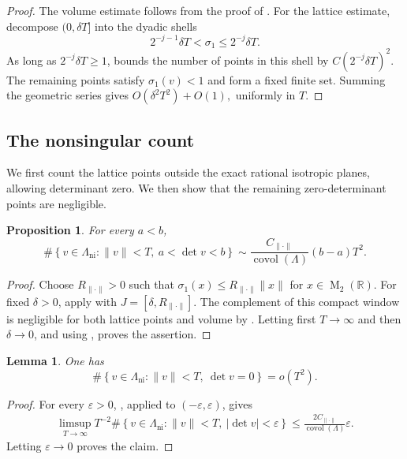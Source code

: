 \documentclass[reqno,11pt]{amsart}
\newtheorem{prop}[prop]{Proposition}
\newtheorem{lem}[lem]{Lemma}
\theoremstyle{definition}
\theoremstyle{remark}
\numberwithin{equation}{section}
\newcommand{\M}{\operatorname{M}}
\newcommand{\covol}{\operatorname{covol}}
\begin{document}
\begin{proof}
The volume estimate follows from the proof of
. For the lattice estimate, decompose $(0,\delta T]$ into the dyadic shells
$$
2^{-j-1}\delta T
<
\sigma_1
\le
2^{-j}\delta T.
$$
As long as $2^{-j}\delta T\ge1$,
 bounds the number of points in this shell
by
$
C(2^{-j}\delta T)^2.
$
The remaining points satisfy $\sigma_1(v)<1$ and form a fixed finite set.
Summing the geometric series gives
$
O(\delta^2T^2)+O(1),
$
uniformly in $T$.
\end{proof}

\subsection{The nonsingular count}
\label{sec:nonsingular-d2}

We first count the lattice points outside the exact rational isotropic
planes, allowing determinant zero. We then show that the remaining
zero-determinant points are negligible.

\begin{prop}
\label{prop:nonisotropic-window-d2}
For every $a<b$,
$$
\#\left\{
v\in\Lambda_{\operatorname{ni}}:
\|v\|<T,\ a<\det v<b
\right\}
\sim
\frac{C_{\|\cdot\|}}{\covol(\Lambda)}
(b-a)T^2.
$$
\end{prop}

\begin{proof}
Choose $R_{\|\cdot\|}>0$ such that
$\sigma_1(x)\le R_{\|\cdot\|}\|x\|$ for
$x\in\M_2(\mathbb R)$.
For fixed $\delta>0$, apply
 with
$J=[\delta,R_{\|\cdot\|}]$. The complement of this compact window is
negligible for both lattice points and volume by
. Letting first $T\to\infty$ and then
$\delta\to0$, and using , proves the assertion.
\end{proof}

\begin{lem}
\label{lem:nonisotropic-zero-negligible-d2}
One has
$$
\#\left\{
v\in\Lambda_{\operatorname{ni}}:
\|v\|<T,\ \det v=0
\right\}
=
o(T^2).
$$
\end{lem}

\begin{proof}
For every $\varepsilon>0$,
, applied to
$(-\varepsilon,\varepsilon)$, gives
$$
\begin{aligned}
\limsup_{T\to\infty}
T^{-2}
\#\left\{
v\in\Lambda_{\operatorname{ni}}:
\|v\|<T,\ |\det v|<\varepsilon
\right\}
\le
\frac{2C_{\|\cdot\|}}{\covol(\Lambda)}
\varepsilon.
\end{aligned}
$$
Letting $\varepsilon\to0$ proves the claim.
\end{proof}
\end{document}
